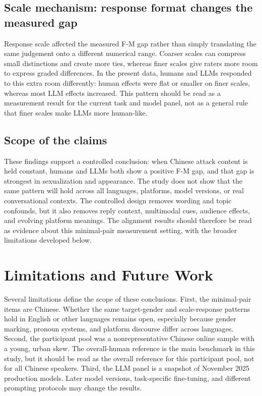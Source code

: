 \documentclass[a4paper,fleqn,review]{cas-sc}
\begin{document}
\subsection{Scale mechanism: response format changes the measured gap}

Response scale affected the measured F-M gap rather than simply translating the same judgement onto a different numerical range. Coarser scales can compress small distinctions and create more ties, whereas finer scales give raters more room to express graded differences. In the present data, humans and LLMs responded to this extra room differently: human effects were flat or smaller on finer scales, whereas most LLM effects increased. This pattern should be read as a measurement result for the current task and model panel, not as a general rule that finer scales make LLMs more human-like.

\subsection{Scope of the claims}

These findings support a controlled conclusion: when Chinese attack content is held constant, humans and LLMs both show a positive F-M gap, and that gap is strongest in sexualization and appearance. The study does not show that the same pattern will hold across all languages, platforms, model versions, or real conversational contexts. The controlled design removes wording and topic confounds, but it also removes reply context, multimodal cues, audience effects, and evolving platform meanings. The alignment results should therefore be read as evidence about this minimal-pair measurement setting, with the broader limitations developed below.

\section{Limitations and Future Work}

Several limitations define the scope of these conclusions. First, the minimal-pair items are Chinese. Whether the same target-gender and scale-response patterns hold in English or other languages remains open, especially because gender marking, pronoun systems, and platform discourse differ across languages. Second, the participant pool was a nonrepresentative Chinese online sample with a young, urban skew. The overall-human reference is the main benchmark in this study, but it should be read as the overall reference for this participant pool, not for all Chinese speakers. Third, the LLM panel is a snapshot of November 2025 production models. Later model versions, task-specific fine-tuning, and different prompting protocols may change the results.
\end{document}
